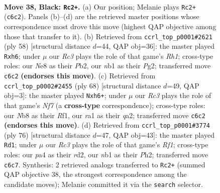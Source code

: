 \documentclass[11pt]{article}
\begin{document}
\clearpage

\begin{figure}[p]\centering
\begin{subfigure}{0.46\textwidth}\centering
\resizebox{\linewidth}{!}{%
\newchessgame
\chessboard[
  setfen={1n2nk2/7Q/2r4p/p4p1P/P4q2/1N6/6K1/RN6 b - - 0 38},
  showmover=false,
  pgfstyle=straightmove, color=movearrow, markmove={c6-c2}
]}
\caption{}
\end{subfigure}\hfill
\begin{subfigure}{0.46\textwidth}\centering
\resizebox{\linewidth}{!}{%
\newchessgame
\chessboard[
  setfen={3r2k1/5p2/1n2p2p/2q1P3/8/1Q3N2/1P3PP1/1K5R w - - 0 30},
  showmover=false,
  pgfstyle=straightmove, color=movearrow, markmove={h1-h6}
]}
\caption{}
\end{subfigure}
\\[4pt]
\begin{subfigure}{0.46\textwidth}\centering
\resizebox{\linewidth}{!}{%
\newchessgame
\chessboard[
  setfen={6k1/1p3N2/1r4np/2p5/r3P3/3Q4/q5PP/5R1K w - - 0 35},
  showmover=false,
  pgfstyle=straightmove, color=movearrow, markmove={f7-h6}
]}
\caption{}
\end{subfigure}\hfill
\begin{subfigure}{0.46\textwidth}\centering
\resizebox{\linewidth}{!}{%
\newchessgame
\chessboard[
  setfen={6k1/1q3p2/5Q1p/4P3/2K1P3/2N3Pn/3r3P/5R2 w - - 0 39},
  showmover=false,
  pgfstyle=straightmove, color=movearrow, markmove={f1-d1}
]}
\caption{}
\end{subfigure}
\caption{\textbf{Move 38, Black: \texttt{Rc2+}.} (a) Our position; Melanie plays \texttt{Rc2+} (\texttt{c6c2}). Panels (b)--(d) are the retrieved master positions whose correspondence most drove this move (highest QAP objective among those that transfer to it). (b) Retrieved from \texttt{ccrl\_top\_p0001\#2621} (ply 58) [structural distance $d$=44, QAP obj=36]: the master played \texttt{Rxh6}; under $\mu$ our \emph{Rc3} plays the role of that game's \emph{Rh1}; cross-type roles: our \emph{N}e8 as their \emph{P}b2, our \emph{n}b1 as their \emph{P}g2; transferred move \texttt{c6c2} \textbf{(endorses this move)}. (c) Retrieved from \texttt{ccrl\_top\_p0002\#2455} (ply 68) [structural distance $d$=49, QAP obj=3]: the master played \texttt{Nxh6+}; under $\mu$ our \emph{Rc3} plays the role of that game's \emph{Nf7} (a \textbf{cross-type} correspondence); cross-type roles: our \emph{N}b8 as their \emph{R}f1, our \emph{r}a1 as their \emph{q}a2; transferred move \texttt{c6c2} \textbf{(endorses this move)}. (d) Retrieved from \texttt{ccrl\_top\_p0001\#3774} (ply 76) [structural distance $d$=47, QAP obj=43]: the master played \texttt{Rd1}; under $\mu$ our \emph{Rc3} plays the role of that game's \emph{Rf1}; cross-type roles: our \emph{p}a4 as their \emph{r}d2, our \emph{n}b1 as their \emph{P}h2; transferred move \texttt{c6c7}. Synthesis: 2 retrieved analogs transferred to \texttt{Rc2+} (summed QAP objective 38, the strongest correspondence among the candidate moves); Melanie committed it via the \texttt{search} selector.}
\label{fig:thought-m75}
\end{figure}
\end{document}
